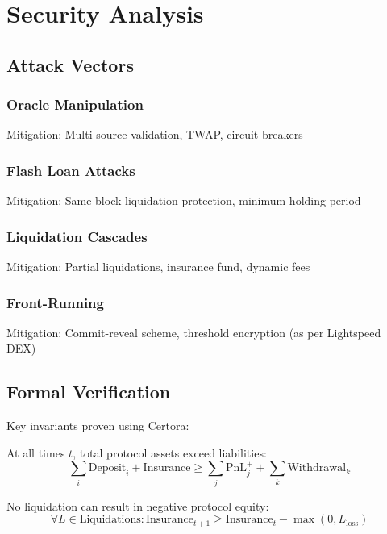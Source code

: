 \section{Security Analysis}


\subsection{Attack Vectors}

\subsubsection{Oracle Manipulation}
Mitigation: Multi-source validation, TWAP, circuit breakers

\subsubsection{Flash Loan Attacks}
Mitigation: Same-block liquidation protection, minimum holding period

\subsubsection{Liquidation Cascades}
Mitigation: Partial liquidations, insurance fund, dynamic fees

\subsubsection{Front-Running}
Mitigation: Commit-reveal scheme, threshold encryption (as per Lightspeed DEX)

\subsection{Formal Verification}

Key invariants proven using Certora:

\begin{theorem}
At all times $t$, total protocol assets exceed liabilities:
\begin{equation}
\sum_{i} \text{Deposit}_i + \text{Insurance} \geq \sum_{j} \text{PnL}_j^+ + \sum_{k} \text{Withdrawal}_k
\end{equation}
\end{theorem}

\begin{theorem}
No liquidation can result in negative protocol equity:
\begin{equation}
\forall L \in \text{Liquidations}: \text{Insurance}_{t+1} \geq \text{Insurance}_t - \max(0, L_{\text{loss}})
\end{equation}
\end{theorem}

